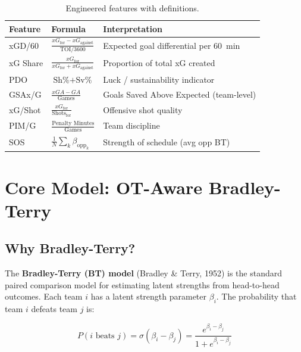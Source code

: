 \documentclass[11pt, a4paper]{article}
\begin{document}
\begin{table}[H]
\centering
\caption{Engineered features with definitions.}
\label{tab:features}
\begin{tabular}{lll}
\toprule
\textbf{Feature} & \textbf{Formula} & \textbf{Interpretation} \\
\midrule
xGD/60 & $\displaystyle\frac{xG_{\text{for}} - xG_{\text{against}}}{\text{TOI} / 3600}$ & Expected goal differential per 60~min \\[8pt]
xG Share & $\displaystyle\frac{xG_{\text{for}}}{xG_{\text{for}} + xG_{\text{against}}}$ & Proportion of total xG created \\[8pt]
PDO & $\text{Sh\%} + \text{Sv\%}$ & Luck / sustainability indicator \\[4pt]
GSAx/G & $\displaystyle\frac{xGA - GA}{\text{Games}}$ & Goals Saved Above Expected (team-level) \\[8pt]
xG/Shot & $\displaystyle\frac{xG_{\text{for}}}{\text{Shots}_{\text{for}}}$ & Offensive shot quality \\[8pt]
PIM/G & $\displaystyle\frac{\text{Penalty Minutes}}{\text{Games}}$ & Team discipline \\[4pt]
SOS & $\displaystyle\frac{1}{N}\sum_{k} \beta_{\text{opp}_k}$ & Strength of schedule (avg opp BT) \\
\bottomrule
\end{tabular}
\end{table}

\section{Core Model: OT-Aware Bradley-Terry}
\label{sec:bt}

\subsection{Why Bradley-Terry?}

The \textbf{Bradley-Terry (BT) model} (Bradley \& Terry, 1952) is the standard paired comparison model for estimating latent strengths from head-to-head outcomes. Each team $i$ has a latent strength parameter $\beta_i$. The probability that team $i$ defeats team $j$ is:

\begin{equation}
\boxed{P(i \text{ beats } j) = \sigma(\beta_i - \beta_j) = \frac{e^{\beta_i - \beta_j}}{1 + e^{\beta_i - \beta_j}}}
\label{eq:bt}
\end{equation}
\end{document}
